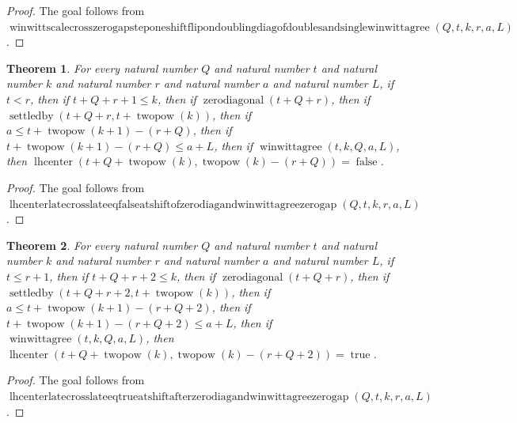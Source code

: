 \documentclass[11pt]{article}
\newtheorem{theorem}{Theorem}[section]
\theoremstyle{definition}
\begin{document}
\begin{proof}
The goal follows from \(\operatorname{winwittscalecrosszerogapsteponeshiftflipondoublingdiagofdoublesandsinglewinwittagree}(Q, t, k, r, a, L)\).
\end{proof}
\begin{theorem}
\label{ll:paper:lhcenter-late-cross-late-eq-false-at-shift-of-zero-diag-and-winwittagree-zero-gap}
For every natural number \(Q\) and natural number \(t\) and natural number \(k\) and natural number \(r\) and natural number \(a\) and natural number \(L\), if \(t < r\), then if \(t + Q + r + 1 \le k\), then if \(\operatorname{zerodiagonal}(t + Q + r)\), then if \(\operatorname{settledby}(t + Q + r, t + \operatorname{twopow}(k))\), then if \(a \le t + \operatorname{twopow}(k + 1) - (r + Q)\), then if \(t + \operatorname{twopow}(k + 1) - (r + Q) \le a + L\), then if \(\operatorname{winwittagree}(t, k, Q, a, L)\), then \(\operatorname{lhcenter}(t + Q + \operatorname{twopow}(k), \operatorname{twopow}(k) - (r + Q)) = \operatorname{false}\).
\end{theorem}
\begin{proof}
The goal follows from \(\operatorname{lhcenterlatecrosslateeqfalseatshiftofzerodiagandwinwittagreezerogap}(Q, t, k, r, a, L)\).
\end{proof}
\begin{theorem}
\label{ll:paper:lhcenter-late-cross-late-eq-true-at-shift-after-zero-diag-and-winwittagree-zero-gap}
For every natural number \(Q\) and natural number \(t\) and natural number \(k\) and natural number \(r\) and natural number \(a\) and natural number \(L\), if \(t \le r + 1\), then if \(t + Q + r + 2 \le k\), then if \(\operatorname{zerodiagonal}(t + Q + r)\), then if \(\operatorname{settledby}(t + Q + r + 2, t + \operatorname{twopow}(k))\), then if \(a \le t + \operatorname{twopow}(k + 1) - (r + Q + 2)\), then if \(t + \operatorname{twopow}(k + 1) - (r + Q + 2) \le a + L\), then if \(\operatorname{winwittagree}(t, k, Q, a, L)\), then \(\operatorname{lhcenter}(t + Q + \operatorname{twopow}(k), \operatorname{twopow}(k) - (r + Q + 2)) = \operatorname{true}\).
\end{theorem}
\begin{proof}
The goal follows from \(\operatorname{lhcenterlatecrosslateeqtrueatshiftafterzerodiagandwinwittagreezerogap}(Q, t, k, r, a, L)\).
\end{proof}
\end{document}
